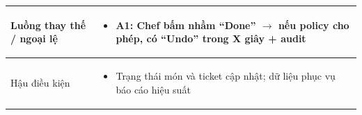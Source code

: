 \begin{longtable}{|>{\raggedright\arraybackslash}p{}|>{\raggedright\arraybackslash}p{}|}
\\
\hline
Luồng thay thế / ngoại lệ &
\vspace{-0.5em}
\begin{itemize}[leftmargin=*]
\item A1: Chef bấm nhầm “Done” $\rightarrow$ nếu policy cho phép, có “Undo” trong X giây + audit
\end{itemize}
\vspace{-0.5em}
\\
\hline
Hậu điều kiện &
\vspace{-0.5em}
\begin{itemize}[leftmargin=*]
\item Trạng thái món và ticket cập nhật; dữ liệu phục vụ báo cáo hiệu suất
\end{itemize}
\vspace{-0.5em}
\\
\hline
\end{longtable}

